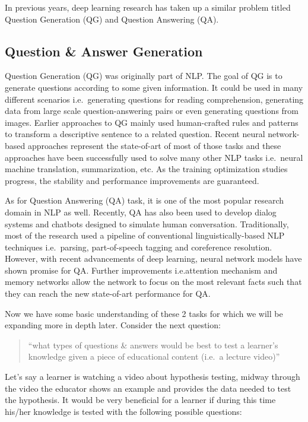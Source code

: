 \documentclass{acm_proc_article-sp}
\begin{document}
In previous years, deep learning research has taken up a similar problem
titled Question Generation (QG) and Question Answering (QA).

\subsection{Question \& Answer
Generation}\label{question-answer-generation}

Question Generation (QG) was originally part of NLP. The goal of QG is
to generate questions according to some given information. It could be
used in many different scenarios i.e.~generating questions for reading
comprehension, generating data from large scale question-answering pairs
or even generating questions from images. Earlier approaches to QG
mainly used human-crafted rules and patterns to transform a descriptive
sentence to a related question. Recent neural network-based approaches
represent the state-of-art of most of those tasks and these approaches
have been successfully used to solve many other NLP tasks i.e.~neural
machine translation, summarization, etc. As the training optimization
studies progress, the stability and performance improvements are
guaranteed.

As for Question Answering (QA) task, it is one of the most popular
research domain in NLP as well. Recently, QA has also been used to
develop dialog systems and chatbots designed to simulate human
conversation. Traditionally, most of the research used a pipeline of
conventional linguistically-based NLP techniques i.e.~parsing,
part-of-speech tagging and coreference resolution. However, with recent
advancements of deep learning, neural network models have shown promise
for QA. Further improvements i.e.attention mechanism and memory networks
allow the network to focus on the most relevant facts such that they can
reach the new state-of-art performance for QA.

Now we have some basic understanding of these 2 tasks for which we will
be expanding more in depth later. Consider the next question:

\begin{quote}
``what types of questions \& answers would be best to test a learner's
knowledge given a piece of educational content (i.e.~a lecture video)''
\end{quote}

Let's say a learner is watching a video about hypothesis testing, midway
through the video the educator shows an example and provides the data
needed to test the hypothesis. It would be very beneficial for a learner
if during this time his/her knowledge is tested with the following
possible questions:
\end{document}
